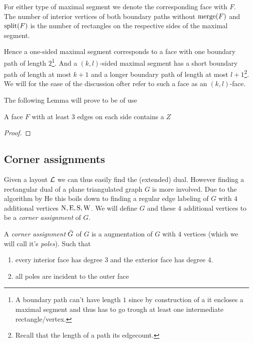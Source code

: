     For either type of maximal segment we denote the corresponding face with $F$. The number of interior vertices of both boundary paths without $\operatorname{merge}(F)$ and $\operatorname{split}(F)$ is the number of rectangles on the respective sides of the maximal segment.

    Hence a one-sided maximal segment corresponds to a face with one boundary path of length $2$\footnote{A boundary path can't have length $1$ since by construction of a \rel it encloses a maximal segment and thus has to go trough at least one intermediate rectangle/vertex.}. And a $(k,l)$-sided maximal segment has a short boundary path of length at most $k+1$ and a longer boundary path of length at most $l+1$\footnote{Recall that the length of a path its edgecount.}.
    We will for the ease of the discussion ofter refer to such a face as an $(k,l)$-face.

    The following Lemma will prove to be of use
    \begin{lemma}
    \label{lm:zInRedFace}
    A face $F$ with at least $3$ edges on each side contains a $Z$
    \end{lemma}
    \begin{proof}
    \end{proof}

\subsection{Corner assignments}
  Given a layout $\mathcal{L}$ we can thus easily find the (extended) dual. However finding a rectangular dual of a plane triangulated graph $G$ is more involved. Due to the algorithm by He \cite{He1993} this boils down to finding a regular edge labeling of $G$ with $4$ additional vertices $\mathrm{N}, \mathrm{E}, \mathrm{S}, \mathrm{W}$. We will define $G$ and these $4$ additional vertices to be a \emph{corner assignment} of $G$.

  \begin{defi}
    A \emph{corner assignment} $\bar{G}$ of $G$ is a augmentation of $G$ with $4$ vertices (which we will call it's \emph{poles}). Such that
    \begin{enumerate}
    \item every interior face has degree $3$ and the exterior face has degree $4$.
    \item all poles are incident to the outer face
    \end{enumerate}
  \end{defi}

